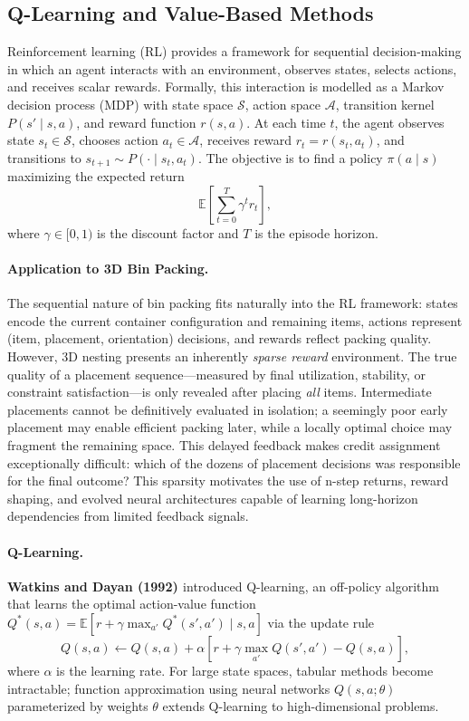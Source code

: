 \subsection{Q-Learning and Value-Based Methods}

Reinforcement learning (RL) provides a framework for sequential decision-making in which an agent interacts with an environment, observes states, selects actions, and receives scalar rewards.\cite{Sutton1998} Formally, this interaction is modelled as a Markov decision process (MDP) with state space $\mathcal{S}$, action space $\mathcal{A}$, transition kernel $P(s' \mid s,a)$, and reward function $r(s,a)$. At each time $t$, the agent observes state $s_t \in \mathcal{S}$, chooses action $a_t \in \mathcal{A}$, receives reward $r_t = r(s_t,a_t)$, and transitions to $s_{t+1}\sim P(\cdot \mid s_t,a_t)$. The objective is to find a policy $\pi(a\mid s)$ maximizing the expected return
\[
\mathbb{E}\!\left[\sum_{t=0}^{T} \gamma^t r_t\right],
\]
where $\gamma\in[0,1)$ is the discount factor and $T$ is the episode horizon.\cite{Sutton1998}

\paragraph{Application to 3D Bin Packing.}
The sequential nature of bin packing fits naturally into the RL framework: states encode the current container configuration and remaining items, actions represent (item, placement, orientation) decisions, and rewards reflect packing quality. However, 3D nesting presents an inherently \textit{sparse reward} environment. The true quality of a placement sequence---measured by final utilization, stability, or constraint satisfaction---is only revealed after placing \textit{all} items. Intermediate placements cannot be definitively evaluated in isolation; a seemingly poor early placement may enable efficient packing later, while a locally optimal choice may fragment the remaining space. This delayed feedback makes credit assignment exceptionally difficult: which of the dozens of placement decisions was responsible for the final outcome? This sparsity motivates the use of n-step returns, reward shaping, and evolved neural architectures capable of learning long-horizon dependencies from limited feedback signals.

\paragraph{Q-Learning.}
\textbf{Watkins and Dayan (1992) \cite{WD92}} introduced Q-learning, an off-policy algorithm that learns the optimal action-value function $Q^*(s,a) = \mathbb{E}\left[ r + \gamma \max_{a'} Q^*(s', a') \mid s, a \right]$ via the update rule
\[
Q(s,a) \leftarrow Q(s,a) + \alpha \left[ r + \gamma \max_{a'} Q(s', a') - Q(s,a) \right],
\]
where $\alpha$ is the learning rate. For large state spaces, tabular methods become intractable; function approximation using neural networks $Q(s,a; \theta)$ parameterized by weights $\theta$ extends Q-learning to high-dimensional problems.

